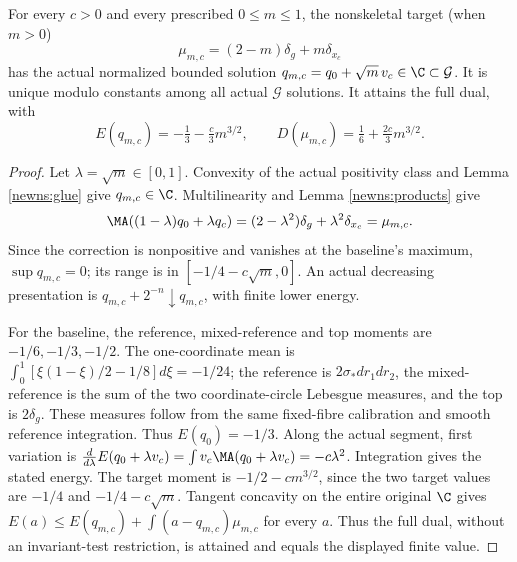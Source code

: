 \begin{theorem}\label{newns:equation}
For every $c>0$ and every prescribed $0\le m\le1$, the nonskeletal
target (when $m>0$)
\[
 \mu_{m,c}=(2-m)\delta_g+m\delta_{x_c}
\]
has the actual normalized bounded solution
$q_{m,c}=q_0+\sqrt m\,v_c\in\C\subset\mathcal G$.
It is unique modulo constants among all actual $\mathcal G$ solutions.
It attains the full dual, with
\[
 E(q_{m,c})=-\tfrac13-\tfrac c3m^{3/2},\qquad
 D(\mu_{m,c})=\tfrac16+\tfrac{2c}{3}m^{3/2}.
\]
\end{theorem}
\begin{proof}
Let $\lambda=\sqrt m\in[0,1]$. Convexity of the actual positivity
class and Lemma \ref{newns:glue} give $q_{m,c}\in\C$.
Multilinearity and Lemma \ref{newns:products} give
\[
 \MA((1-\lambda)q_0+\lambda q_c)
 =(2-\lambda^2)\delta_g+\lambda^2\delta_{x_c}=\mu_{m,c}.
\]
Since the correction is nonpositive and vanishes at the baseline's
maximum, $\sup q_{m,c}=0$; its range is in $[-1/4-c\sqrt m,0]$.
An actual decreasing presentation is $q_{m,c}+2^{-n}\downarrow q_{m,c}$,
with finite lower energy.

For the baseline, the reference, mixed-reference and top moments are
$-1/6,-1/3,-1/2$. The one-coordinate mean is
$\int_0^1[\xi(1-\xi)/2-1/8]d\xi=-1/24$;
the reference is $2\sigma_*dr_1dr_2$, the mixed-reference is the sum
of the two coordinate-circle Lebesgue measures, and the top is $2\delta_g$.
These measures follow from the same fixed-fibre calibration and smooth
reference integration. Thus $E(q_0)=-1/3$.
Along the actual segment, first variation is
$\frac d{d\lambda}E(q_0+\lambda v_c)=\int v_c\MA(q_0+\lambda v_c)
=-c\lambda^2$. Integration gives the stated energy.
The target moment is $-1/2-cm^{3/2}$, since the two target values are
$-1/4$ and $-1/4-c\sqrt m$.
Tangent concavity on the entire original $\C$ gives
$E(a)\le E(q_{m,c})+\int(a-q_{m,c})\mu_{m,c}$ for every $a$.
Thus the full dual, without an invariant-test restriction, is attained
and equals the displayed finite value.


\end{proof}
